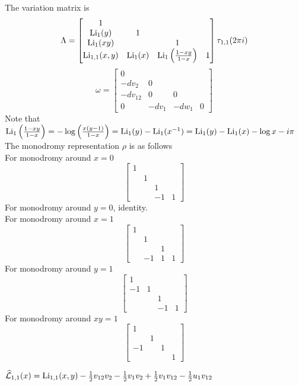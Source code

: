 \documentclass[main]{subfiles}
\begin{document}
The variation matrix is
\[\Lambda=\begin{bmatrix}
1&&&\\
\operatorname{Li}_1(y)&1&&\\
\operatorname{Li}_1(xy)&&1&\\
\operatorname{Li}_{1,1}(x,y)&\operatorname{Li}_1(x)&\operatorname{Li}_1\left(\frac{1-xy}{1-x}\right)&1
\end{bmatrix}\tau_{1,1}(2\pi i)\]
\[\omega=\begin{bmatrix}
0&&&\\
-dv_2&0&&\\
-dv_{12}&0&0&\\
0&-dv_1&-dw_1&0
\end{bmatrix}\]
Note that $\operatorname{Li}_1\left(\frac{1-xy}{1-x}\right)=-\log\left(\frac{x(y-1)}{1-x}\right)=\operatorname{Li}_1(y)-\operatorname{Li}_1(x^{-1})=\operatorname{Li}_1(y)-\operatorname{Li}_1(x)-\log x-i\pi$ \\
The monodromy representation $\rho$ is as follows \\
For monodromy around $x=0$
\[\begin{bmatrix}
1&&& \\
&1&& \\
&&1& \\
&&-1&1
\end{bmatrix}\]
For monodromy around $y=0$, identity. \\
For monodromy around $x=1$
\[\begin{bmatrix}
1&&& \\
&1&& \\
&&1& \\
&-1&1&1
\end{bmatrix}\]
For monodromy around $y=1$
\[\begin{bmatrix}
1&&& \\
-1&1&& \\
&&1& \\
&&-1&1
\end{bmatrix}\]
For monodromy around $xy=1$
\[\begin{bmatrix}
1&&& \\
&1&& \\
-1&&1& \\
&&&1
\end{bmatrix}\]

$\widehat{\mathcal L}_{1,1}(x)=\operatorname{Li}_{1, 1}(x,y) - \frac{1}{2}v_{12} v_2 - \frac{1}{2}v_1 v_2 + \frac{1}{2}v_1 v_{12} - \frac{1}{2}u_1 v_{12}$
\end{document}

